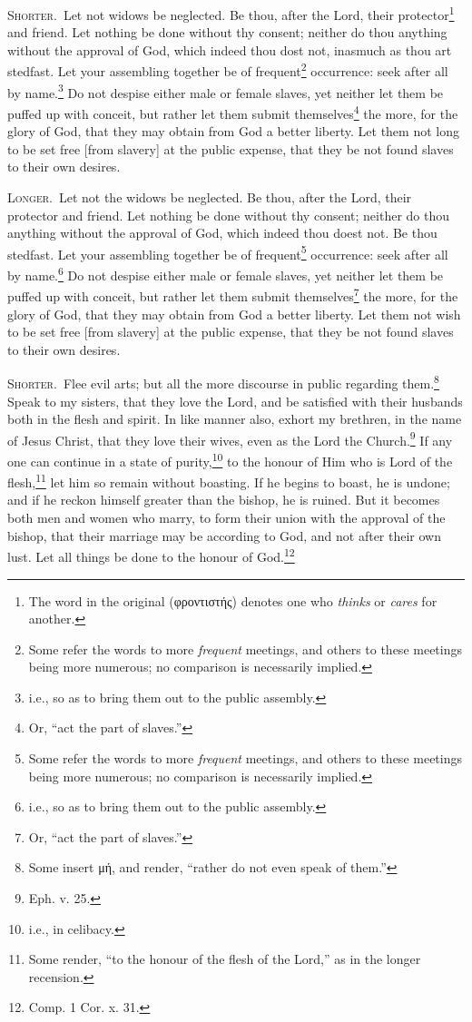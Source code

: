 
\textsc{Shorter.}~Let not widows be neglected. Be thou, after the Lord, their protector\footnote{The word in the original (\textgreek{φροντιστής}) denotes one who \emph{thinks} or \emph{cares} for another.} and friend. Let nothing be done without thy consent; neither do thou anything without the approval of God, which indeed thou dost not, inasmuch as thou art stedfast. Let your assembling together be of frequent\footnote{Some refer the words to more \emph{frequent} meetings, and others to these meetings being more numerous; no comparison is necessarily implied.} occurrence: seek after all by name.\footnote{i.e., so as to bring them out to the public assembly.} Do not despise either male or female slaves, yet neither let them be puffed up with conceit, but rather let them  submit themselves\footnote{Or, “act the part of slaves.”} the more, for the glory of God, that they may obtain from God a better liberty. Let them not long to be set free [from slavery] at the public expense, that they be not found slaves to their own desires.

\textsc{Longer.}~Let not the widows be neglected. Be thou, after the Lord, their protector and friend. Let nothing be done without thy consent; neither do thou anything without the approval of God, which indeed thou doest not. Be thou stedfast. Let your assembling together be of frequent\footnote{Some refer the words to more \emph{frequent} meetings, and others to these meetings being more numerous; no comparison is necessarily implied.} occurrence: seek after all by name.\footnote{i.e., so as to bring them out to the public assembly.} Do not despise either male or female slaves, yet neither let them be puffed up with conceit, but rather let them submit themselves\footnote{Or, “act the part of slaves.”} the more, for the glory of God, that they may obtain from God a better liberty. Let them not wish to be set free [from slavery] at the public expense, that they be not found slaves to their own desires.


\textsc{Shorter.}~Flee evil arts; but all the more discourse in public regarding them.\footnote{Some insert \textgreek{μή}, and render, “rather do not even speak of them.”} Speak to my sisters, that they love the Lord, and be satisfied with their husbands both in the flesh and spirit. In like manner also, exhort my brethren, in the name of Jesus Christ, that they love their wives, even as the Lord the Church.\footnote{Eph. v. 25.} If any one can continue in a state of purity,\footnote{i.e., in celibacy.} to the honour of Him who is Lord of the flesh,\footnote{Some render, “to the honour of the flesh of the Lord,” as in the longer recension.} let him so remain without boasting. If he begins to boast, he is undone; and if he reckon himself greater than the bishop, he is ruined. But it becomes both men and women who marry, to form their union with the approval of the bishop, that their marriage may be according to God, and not after their own lust. Let all things be done to the honour of God.\footnote{Comp. 1 Cor. x. 31.}

